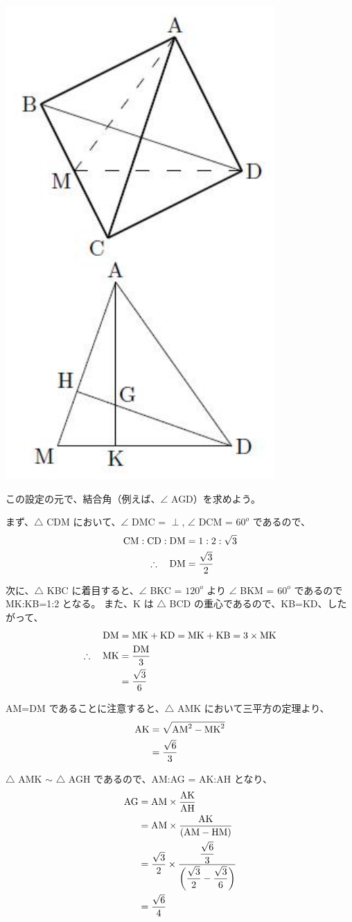 \documentclass[uplatex,dvipdfmx,a4paper,11pt, titlepage]{jsarticle}
\begin{document}
\begin{appendix}
\begin{center}
	\includegraphics[width= 5 cm]{figure/Carbon_BA.pdf}
\end{center}
この設定の元で、結合角（例えば、$\angle$ AGD）を求めよう。

まず、$\bigtriangleup$ CDM において、$\angle$ DMC = $\perp$, $\angle$ DCM = $60^o$ であるので、
\begin{align*}
{\rm CM} : {\rm CD} : {\rm DM} &= 1: 2 : \sqrt{3} \\
\therefore \quad {\rm DM} &= \dfrac{\sqrt{3}}{2}
\end{align*}

次に、$\bigtriangleup$ KBC に着目すると、$\angle$ BKC = $120^o$ より $\angle$ BKM = $60^o$ であるので MK:KB=1:2 となる。
また、K は $\bigtriangleup$ BCD の重心であるので、KB=KD、したがって、
\begin{align*}
{\rm DM} &= {\rm MK} + {\rm KD} = {\rm MK} + {\rm KB} = 3 \times {\rm MK} \\
\therefore \quad {\rm MK} 
	&=\dfrac{ {\rm DM} }{3} \\
	&=\dfrac{\sqrt{3}}{6}
\end{align*}

AM=DM であることに注意すると、$\bigtriangleup$ AMK において三平方の定理より、
\begin{align*}
{\rm AK} 
	&= \sqrt{ {\rm AM}^2 - {\rm MK}^2 } \\
	&= \dfrac{\sqrt{6}}{3}
\end{align*}

$\bigtriangleup$ AMK $\sim$ $\bigtriangleup$ AGH であるので、AM:AG = AK:AH となり、
\begin{align*}
{\rm AG} 
	&= { {\rm AM} } \times \dfrac{ {\rm AK} }{ {\rm AH} } \\
	&= { {\rm AM} } \times \dfrac{ {\rm AK} }{ ({\rm AM} - {\rm HM}) } \\
	&= \dfrac{\sqrt{3}}{2} \times \dfrac{ \dfrac{\sqrt{6}}{3} }{ \left( \dfrac{\sqrt{3}}{2} - \dfrac{\sqrt{3}}{6} \right) } \\
	&= \dfrac{ \sqrt{6} }{ 4 }
\end{align*}


\end{appendix}
\end{document}
